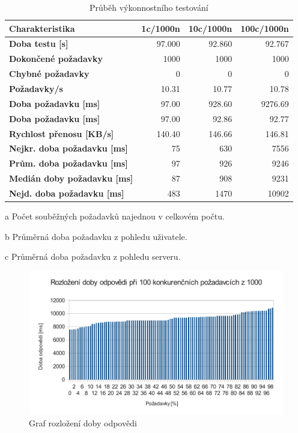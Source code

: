 \begin{table}
\begin{center}
\begin{threeparttable}
\begin{tabular}{|l|r|r|r|}
\hline
\textbf{Charak\-te\-ristika} & \textbf{1c/1000n\tnote{a}} & \textbf{10c/1000n\tnote{a}} & \textbf{100c/1000n\tnote{a}} \\
\hline
\textbf{Doba testu [s]} & {97.000} & {92.860} & {92.767} \\
\textbf{Dokončené požadavky} & {1000} & {1000} & {1000} \\
\textbf{Chybné požadavky} & {0} & {0} & {0} \\
\textbf{Požadavky/s} & {10.31} & {10.77} & {10.78} \\
\textbf{Doba požadavku\tnote{b} [ms]} & {97.00} & {928.60} & {9276.69} \\
\textbf{Doba požadavku\tnote{c} [ms]} & {97.00} & {92.86} & {92.77} \\
\textbf{Rychlost přenosu [KB/s]} & {140.40} & {146.66} & {146.81} \\
\hline
\textbf{Nejkr. doba požadavku [ms]} & {75} & {630} & {7556} \\
\textbf{Prům. doba požadavku [ms]} & {97} & {926} & {9246} \\
\textbf{Medián doby požadavku [ms]} & {87} & {908} & {9231} \\
\textbf{Nejd. doba požadavku [ms]} & {483} & {1470} & {10902} \\
\hline
\end{tabular}
\begin{tablenotes}
 \item[a] Počet souběžných požadavků najednou v celkovém počtu.
 \item[b] Průměrná doba požadavku z pohledu uživatele.
 \item[c] Průměrná doba požadavku z pohledu serveru.
\end{tablenotes}
\caption{Průběh výkonnostního testování}
\label{tab:vykonnostniTesty}
\end{threeparttable}
\end{center}
\end{table}

\begin{figure}[h]
 \centering
 \includegraphics[width=12cm]{./figures/100-1000.pdf}
 \caption{Graf rozložení doby odpovědi}
 \label{fig:vykonnostniTesty}
\end{figure}

